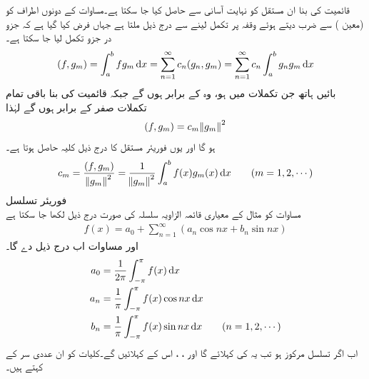 قائمیت کی بنا ان مستقل کو نہایت آسانی سے حاصل کیا جا سکتا ہے۔مساوات  کے دونوں اطراف کو  (معین  ) سے ضرب دیتے ہوئے وقفہ  پر تکمل لینے سے درج ذیل ملتا ہے جہاں فرض کیا گیا ہے کہ جزو در جزو تکمل لیا جا سکتا ہے۔ 
\begin{align*}
(f,g_m)=\int_{a}^{b}fg_m\dif x=\sum_{n=1}^{\infty} c_n(g_n,g_m)=\sum_{n=1}^{\infty} c_n\int_{a}^{b} g_n g_m \dif x
\end{align*}
بائیں ہاتھ جن تکملات میں  ہو، وہ   کے برابر ہوں گے جبکہ قائمیت کی بنا  باقی تمام تکملات صفر کے برابر ہوں گے لہٰذا
\begin{align}\label{مساوات_طاقتی_اضافی_فوریئر_عمومی_ب}
(f,g_m)=c_m\norm{g_m}^2
\end{align}
ہو گا اور یوں فوریئر مستقل کا درج ذیل کلیہ حاصل ہوتا ہے۔
\begin{align}\label{مساوات_طاقتی_اضافی_فوریئر_عمومی_پ}
c_m=\frac{(f,g_m)}{\norm{g_m}^2}=\frac{1}{\norm{g_m}^2}\int_{a}^{b} f(x)g_m(x)\dif x \quad \quad (m=1,2,\cdots)
\end{align}
\quad فوریئر تسلسل\\
مساوات  کو مثال  کے معیاری قائمہ الزاویہ سلسلہ کی صورت درج ذیل لکھا جا سکتا ہے
\begin{align}\label{مساوات_طاقتی_اضافی_فوریئر_عمومی_ت}
f(x)=a_0+\sum_{n=1}^{\infty}(a_n\cos nx+b_n\sin nx)
\end{align}
اور مساوات  اب درج ذیل دے گا۔
\begin{gather}
\begin{aligned}\label{مساوات_طاقتی_اضافی_فوریئر_عمومی_ٹ}
a_0&=\frac{1}{2\pi}\int_{-\pi}^{\pi} f(x)\dif x\\
a_n&=\frac{1}{\pi}\int_{-\pi}^{\pi} f(x)\cos nx \dif x\\
b_n&=\frac{1}{\pi}\int_{-\pi}^{\pi}f(x)\sin nx \dif x\quad \quad (n=1,2,\cdots)
\end{aligned}
\end{gather} 
اب اگر تسلسل  مرکوز ہو تب یہ  کی  کہلائے گا اور ، ،  اس کے  کہلائیں گے۔کلیات  کو ان عددی سر کے  کہتے ہیں۔

